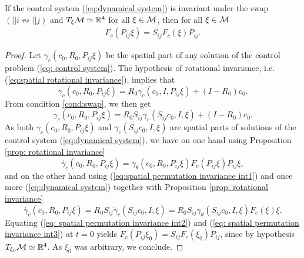 \begin{proposition}
\label{prop: spatial permutation invariance}
If the control system (\ref{eq:dynamical system}) is invariant under the swap $(||i \leftrightsquigarrow ||j)$ and $T_{\xi} \mathcal{M} \simeq \mathbb{R}^4$ for all $\xi \in \mathcal{M}$, then for all $\xi \in \mathcal{M}$
\begin{align}
	 F_c(P_{ij} \xi) = S_{ij} F_c(\xi) P_{ij}.
\end{align}
\end{proposition}

\begin{proof}
Let $\gamma_c(c_0, R_0, P_{ij} \xi)$ be the spatial part of any solution of the control problem (\ref{eq: control system}). The hypothesis of rotational invariance, i.e. (\ref{eq:spatial rotational invariance}), implies that
\begin{equation}
	\gamma_c(c_0, R_0, P_{ij} \xi) = R_0 \gamma_c(c_0, I, P_{ij} \xi) + (I - R_0)c_0.
\end{equation}
From condition \ref{cond:swap}, we then get
\begin{equation}
\label{eq:spatial permutation invariance int1}
	\gamma_c(c_0, R_0, P_{ij}\xi) = R_0 S_{ij} \gamma_c(S_{ij} c_0, I, \xi) + (I - R_0)c_0.
\end{equation}
As both $\gamma_c(c_0, R_0, P_{ij} \xi)$ and $\gamma_c(S_{ij} c_0, I, \xi)$ are spatial parts of solutions of the control system (\ref{eq:dynamical system}), we have on one hand using Proposition \ref{prop: rotational invariance}
\begin{equation}
\label{eq: spatial permutation invariance int2}
	\dot{\gamma_c}(c_0, R_0, P_{ij} \xi) = \gamma_{\theta}(c_0, R_0, P_{ij} \xi) F_c(P_{ij} \xi) P_{ij} \dot{\xi},
\end{equation}
and on the other hand using (\ref{eq:spatial permutation invariance int1}) and once more (\ref{eq:dynamical system}) together with Proposition \ref{prop: rotational invariance}
\begin{equation}
\label{eq: spatial permutation invariance int3}
	\dot{\gamma_c}(c_0, R_0, P_{ij} \xi) = R_0 S_{ij} \dot{\gamma}_c(S_{ij} c_0, I, \xi) = R_0 S_{ij} \gamma_\theta(S_{ij} c_0, I, \xi) F_c(\xi) \dot{\xi}.
\end{equation}
Equating (\ref{eq: spatial permutation invariance int2}) and (\ref{eq: spatial permutation invariance int3}) at $t = 0$ yields $ F_c(P_{ij} \xi_0) = S_{ij} F_c(\xi_0) P_{ij}$, since by hypothesis $T_{\xi_0} \mathcal{M} \simeq \mathbb{R}^4$. As $\xi_0$ was arbitrary, we conclude.
\end{proof}

